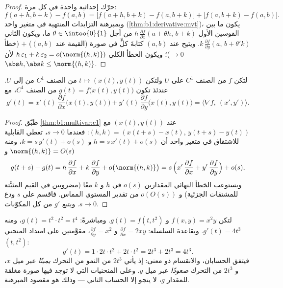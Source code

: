 \begin{proof}
حرّك إحداثية واحدة في كل مرة:
\[
f(a+h, b+k) - f(a,b)
= \bigl[f(a+h, b+k) - f(a, b+k)\bigr] + \bigl[f(a, b+k) -
f(a,b)\bigr].
\]
وبمبرهنة التزايدات المنتهية في متغير واحد
(\cref{thm:b1:derivative:mvt})، يكون ما بين القوسين الأول $h\,
\frac{\partial f}{\partial x}(a + \theta h,\, b + k)$ من أجل
$\theta \in \intoo{0}{1}$ ما، ويكون الثاني $k\,\frac{\partial
f}{\partial y}(a,\, b + \theta' k)$. ويتيح   عند
$(a,b)$ كتابةَ كلٍّ في صورة (القيمة عند $(a,b)$) $+$
(خطأ $\to 0$)؛ ويكون الخطأ الكلي $h\,\varepsilon_1 +
k\,\varepsilon_2 = o(\norm{(h,k)})$ لأن $\abs h, \abs k \leq
\norm{(h,k)}$.
\end{proof}

\begin{theorem}\label{thm:b1:multivar:chain}
لتكن $f$ من الصنف $C^1$ على $U$ ولتكن $t \mapsto (x(t), y(t))$ من الصنف $C^1$ من
 إلى $U$. عندئذ تكون $g(t) = f\bigl(x(t), y(t)\bigr)$
من الصنف $C^1$، مع
\[
g'(t) = x'(t)\,\frac{\partial f}{\partial x}\bigl(x(t),y(t)\bigr)
+ y'(t)\,\frac{\partial f}{\partial y}\bigl(x(t),y(t)\bigr)
= \bigl\langle \nabla f,\ (x', y')\bigr\rangle .
\]
\end{theorem}

\begin{proof}
طبّق \cref{thm:b1:multivar:c1} عند $(x(t), y(t))$ مع $(h, k) =
(x(t+s) - x(t),\, y(t+s) - y(t))$: فعندما $s \to 0$، تعطي القابلية للاشتقاق في متغير
واحد أن $h = s\,x'(t) + o(s)$ و $k = s\,y'(t)
+ o(s)$، ومنه $\norm{(h, k)} = O(s)$ و
\[
g(t+s) - g(t)
= h\,\frac{\partial f}{\partial x} + k\,\frac{\partial
f}{\partial y} + o\bigl(\norm{(h,k)}\bigr)
= s\,\Bigl(x'\,\frac{\partial f}{\partial x} +
y'\,\frac{\partial f}{\partial y}\Bigr) + o(s) ,
\]
ويستوعب الخطأ النهائي المقدارين $o(s)$ في $h$ و $k$ معًا
(مضروبين في القيم المثبَّتة للمشتقات الجزئية) و
$o(O(s))$ من تقدير المستوي المماس. فاقسم على $s$ ودع
$s \to 0$. ويتبع  $g'$ من  كل
المكوّنات.
\end{proof}

\begin{example}
\label{ex:b1:multivar:chainrun}
لتكن $f(x, y) = x^2 y$ و $g(t) = f(t, t^2)$. ومباشرةً: $g(t) =
t^2\cdot t^2 = t^4$، ومنه $g'(t) = 4t^3$. وبقاعدة السلسلة:
$\frac{\partial f}{\partial x} = 2xy$ و $\frac{\partial
f}{\partial y} = x^2$، مقوَّمتين على امتداد المنحني $(t, t^2)$:
\[
g'(t) = 1\cdot 2t\cdot t^2 + 2t\cdot t^2 = 2t^3 + 2t^3 = 4t^3 .
\]
فيتفق الحسابان، والانقسام ذو معنى: إذ يأتي $2t^3$
من النمو من التحرك \emph{يمينًا} عبر ميل
$x$، و $2t^3$ من التحرك \emph{صعودًا} عبر ميل
$y$. وعلى المنحنيات التي لا توجد فيها صورة مغلقة للمقدار $g$، لا
ينجو إلا الحساب الثاني --- وذلك هو مقصود المبرهنة.
\end{example}

